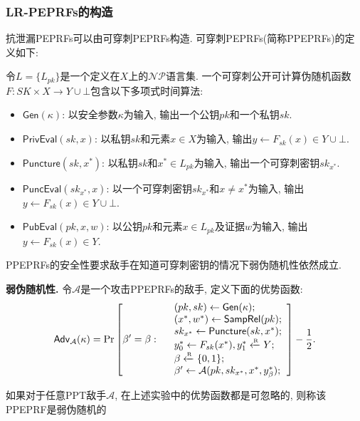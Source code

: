 \subsubsection{LR-PEPRFs的构造}
抗泄漏PEPRFs可以由可穿刺PEPRFs构造. 可穿刺PEPRFs(简称PPEPRFs)的定义如下:
\begin{definition}[可穿刺公开可计算伪随机函数]
令$L = \{L_{pk}\}$是一个定义在$X$上的$\mathcal{NP}$语言集. 一个可穿刺公开可计算伪随机函数$F: SK \times X \rightarrow Y \cup \bot$包含以下多项式时间算法:
\begin{itemize} \itemsep 1pt \parskip 0pt \parsep 0pt
\item $\mathsf{Gen}(\kappa)$: 以安全参数$\kappa$为输入, 输出一个公钥$pk$和一个私钥$sk$. 

\item $\mathsf{PrivEval}(sk, x)$: 以私钥$sk$和元素$x \in X$为输入, 输出$y \leftarrow F_{sk}(x) \in Y \cup \bot$. 

\item $\mathsf{Puncture}(sk, x^*)$: 以私钥$sk$和$x^* \in L_{pk}$为输入, 输出一个可穿刺密钥$sk_{x^*}$. 

\item $\mathsf{PuncEval}(sk_{x^*}, x)$: 以一个可穿刺密钥$sk_{x^*}$和$x \neq x^*$为输入, 输出$y \leftarrow F_{sk}(x) \in Y \cup \bot$. 

\item $\mathsf{PubEval}(pk, x, w)$: 以公钥$pk$和元素$x \in L_{pk}$及证据$w$为输入, 
输出$y \leftarrow F_{sk}(x) \in Y$. 
\end{itemize}
\end{definition}

PPEPRFs的安全性要求敌手在知道可穿刺密钥的情况下弱伪随机性依然成立. 
\begin{trivlist}
\item \textbf{弱伪随机性.} 令$\mathcal{A}$是一个攻击PPEPRFs的敌手, 定义下面的优势函数:
\begin{displaymath}
    \mathsf{Adv}_\mathcal{A}(\kappa) =
        \Pr \left[ \beta' = \beta: 
            \begin{array}{ll}
                & (pk, sk) \leftarrow \mathsf{Gen}(\kappa);\\
                & (x^*, w^*) \leftarrow \mathsf{SampRel}(pk); \\
                & sk_{x^*} \leftarrow \mathsf{Puncture}(sk, x^*);\\ 
                & y_0^* \leftarrow F_{sk}(x^*), y_1^* \xleftarrow{\textup{\tiny R}} Y;\\
                & \beta \xleftarrow{\textup{\tiny R}} \{0,1\};\\ 
                & \beta' \leftarrow \mathcal{A}(pk, sk_{x^*}, x^*, y_\beta^*);
            \end{array} 
            \right]  - \frac{1}{2}.
    \end{displaymath}    
\end{trivlist} 
如果对于任意PPT敌手$\mathcal{A}$, 在上述实验中的优势函数都是可忽略的, 则称该PPEPRF是弱伪随机的 


